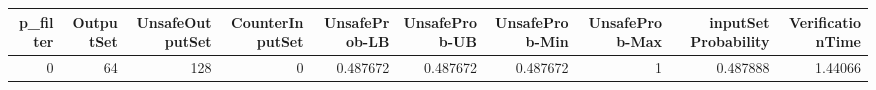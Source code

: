 \begin{tabular}{rrrrrrrrrr}
\hline
   p\_filter &   OutputSet &   UnsafeOutputSet &   CounterInputSet &   UnsafeProb-LB &   UnsafeProb-UB &   UnsafeProb-Min &   UnsafeProb-Max &   inputSet Probability &   VerificationTime \\
\hline
          0 &          64 &               128 &                 0 &        0.487672 &        0.487672 &         0.487672 &                1 &               0.487888 &            1.44066 \\
\hline
\end{tabular}
